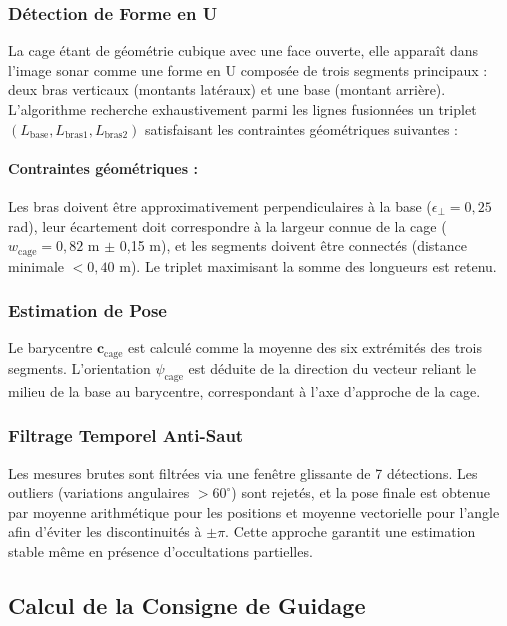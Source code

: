 \subsubsection*{Détection de Forme en U}

La cage étant de géométrie cubique avec une face ouverte, elle apparaît dans l'image sonar comme une forme en U composée de trois segments principaux : deux bras verticaux (montants latéraux) et une base (montant arrière). L'algorithme recherche exhaustivement parmi les lignes fusionnées un triplet $(L_{\text{base}}, L_{\text{bras1}}, L_{\text{bras2}})$ satisfaisant les contraintes géométriques suivantes :

\paragraph{Contraintes géométriques :} 

Les bras doivent être approximativement perpendiculaires à la base ($\epsilon_\perp = 0{,}25$ rad), leur écartement doit correspondre à la largeur connue de la cage ($w_{\text{cage}} = 0{,}82$ m $\pm$ 0,15 m), et les segments doivent être connectés (distance minimale $< 0{,}40$ m). Le triplet maximisant la somme des longueurs est retenu.

\subsubsection*{Estimation de Pose}

Le barycentre $\mathbf{c}_{\text{cage}}$ est calculé comme la moyenne des six extrémités des trois segments. L'orientation $\psi_{\text{cage}}$ est déduite de la direction du vecteur reliant le milieu de la base au barycentre, correspondant à l'axe d'approche de la cage.

\subsubsection*{Filtrage Temporel Anti-Saut}

Les mesures brutes sont filtrées via une fenêtre glissante de 7 détections. Les outliers (variations angulaires $> 60^{\circ}$) sont rejetés, et la pose finale est obtenue par moyenne arithmétique pour les positions et moyenne vectorielle pour l'angle afin d'éviter les discontinuités à $\pm\pi$. Cette approche garantit une estimation stable même en présence d'occultations partielles.

\subsection{Calcul de la Consigne de Guidage}

